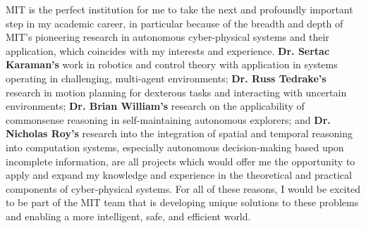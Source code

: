 \documentclass[11pt]{letter}
\begin{document}
MIT is the perfect institution for me to take the next and profoundly important step in my academic career, in particular because of the breadth and depth of MIT’s pioneering research in autonomous cyber-physical systems and their application, which coincides with my interests and experience.  \textbf{Dr. Sertac Karaman’s} work in robotics and control theory with application in systems operating in challenging, multi-agent environments; \textbf{Dr. Russ Tedrake’s} research in motion planning for dexterous tasks and interacting with uncertain environments; \textbf{Dr. Brian William’s} research on the applicability of commonsense reasoning in self-maintaining autonomous explorers; and \textbf{Dr. Nicholas Roy’s} research into the integration of spatial and temporal reasoning into computation systems, especially autonomous decision-making based upon incomplete information, are all projects which would offer me the opportunity to apply and expand my knowledge and experience in the theoretical and practical components of cyber‑physical systems.  For all of these reasons, I would be excited to be part of the MIT team that is developing unique solutions to these problems and enabling a more intelligent, safe, and efficient world.


\begin{comment}
{\bf \emph{References}}

[1] "Cyber-Physical Systems." Baheti and Gill

[2] "Optimization and Control of Cyber-Physical Vehicle Systems." Bradley and Atkins

\end{comment}
\end{document}
